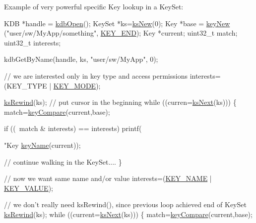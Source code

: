 \begin{DoxyParagraph}{Example of very powerful specific Key lookup in a Key\-Set\-:}

\begin{DoxyCode}
KDB *handle = \hyperlink{group__kdb_ga6808defe5870f328dd17910aacbdc6ca}{kdbOpen}();
KeySet *ks=\hyperlink{group__keyset_ga671e1aaee3ae9dc13b4834a4ddbd2c3c}{ksNew}(0);
Key *base = \hyperlink{group__key_gad23c65b44bf48d773759e1f9a4d43b89}{keyNew} (\textcolor{stringliteral}{"user/sw/MyApp/something"}, \hyperlink{group__key_gga91fb3178848bd682000958089abbaf40aa8adb6fcb92dec58fb19410eacfdd403}{KEY\_END});
Key *current;
uint32\_t match;
uint32\_t interests;


kdbGetByName(handle, ks, \textcolor{stringliteral}{"user/sw/MyApp"}, 0);

\textcolor{comment}{// we are interested only in key type and access permissions}
interests=(KEY\_TYPE | \hyperlink{group__key_gga91fb3178848bd682000958089abbaf40a1b0a91ff3a855d6993930ebf0abaa518}{KEY\_MODE});

\hyperlink{group__keyset_gabe793ff51f1728e3429c84a8a9086b70}{ksRewind}(ks);   \textcolor{comment}{// put cursor in the beginning}
\textcolor{keywordflow}{while} ((curren=\hyperlink{group__keyset_ga317321c9065b5a4b3e33fe1c399bcec9}{ksNext}(ks))) \{
        match=\hyperlink{group__keytest_gab98168409d302fdb65692f6e26f17945}{keyCompare}(current,base);
        
        \textcolor{keywordflow}{if} ((~match & interests) == interests)
                printf(\textcolor{stringliteral}{"Key %
      \hyperlink{group__keyname_ga8e805c726a60da921d3736cda7813513}{keyName}(current));

        \textcolor{comment}{// continue walking in the KeySet....}
\}

\textcolor{comment}{// now we want same name and/or value}
interests=(\hyperlink{group__key_gga91fb3178848bd682000958089abbaf40ad6127fc38f96410bf7c8f6e93b0397da}{KEY\_NAME} | \hyperlink{group__key_gga91fb3178848bd682000958089abbaf40ac66e4a49d09212b79f5754ca6db5bd2e}{KEY\_VALUE});

\textcolor{comment}{// we don't really need ksRewind(), since previous loop achieved end of KeySet}
\hyperlink{group__keyset_gabe793ff51f1728e3429c84a8a9086b70}{ksRewind}(ks);
\textcolor{keywordflow}{while} ((current=\hyperlink{group__keyset_ga317321c9065b5a4b3e33fe1c399bcec9}{ksNext}(ks))) \{
        match=\hyperlink{group__keytest_gab98168409d302fdb65692f6e26f17945}{keyCompare}(current,base);

}
\end{DoxyCode}
\end{DoxyParagraph}
